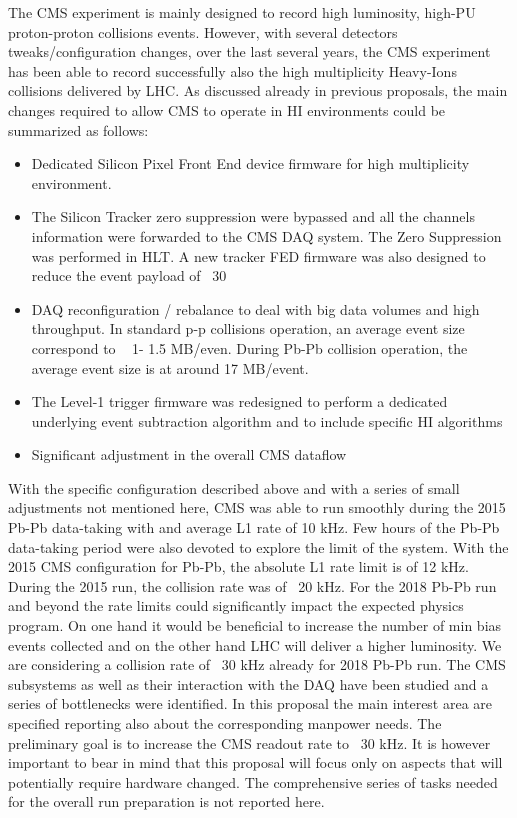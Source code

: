 \newpage


The CMS experiment is mainly designed to record high luminosity, high-PU proton-proton collisions events.  However, with
several detectors tweaks/configuration changes, over the last several years, the CMS experiment has been able to record
successfully also the high multiplicity Heavy-Ions collisions delivered by LHC. As discussed already in previous
proposals, the main changes required to allow CMS to operate in HI environments could be summarized as follows:

\begin{itemize}
\item Dedicated Silicon Pixel Front End device firmware for high multiplicity environment. 
\item The Silicon Tracker zero suppression were bypassed and all the channels information were forwarded to the CMS DAQ system. The Zero Suppression was performed in HLT. A new tracker FED firmware was also designed to reduce the event payload of ~30%
\item DAQ reconfiguration / rebalance to deal with big data volumes and high throughput. In standard p-p collisions operation, an average event size correspond to ~ 1- 1.5 MB/even. During Pb-Pb collision operation, the average event size is at around 17 MB/event. 
\item The Level-1 trigger firmware was redesigned to perform a dedicated underlying event subtraction algorithm and to include specific HI algorithms 
\item Significant adjustment in the overall CMS dataflow
\end{itemize}


With the specific configuration described above and with a series of small adjustments not mentioned here, CMS was able
to run smoothly during the 2015 Pb-Pb data-taking with and average L1 rate of 10 kHz. Few hours of the Pb-Pb data-taking
period were also devoted to explore the limit of the system.  With the 2015  CMS configuration for Pb-Pb, the absolute
L1 rate limit is of 12 kHz. During the 2015 run, the collision rate was of ~20 kHz. For the 2018 Pb-Pb run and beyond
the rate limits could significantly impact the expected physics program. On one hand it would be beneficial to increase
the number of min bias events collected and on the other hand LHC will deliver a higher luminosity. We are considering a
collision rate of ~30 kHz already for 2018 Pb-Pb run. The CMS subsystems as well as their interaction with the DAQ have
been studied and a series of bottlenecks were identified. In this proposal the main interest area are specified
reporting also about the corresponding manpower needs. The preliminary goal is to increase the CMS readout rate to ~30
kHz. It is however important to bear in mind that this proposal will focus only on aspects that will potentially require
hardware changed.  The comprehensive series of tasks needed for the overall run preparation is not reported here. 





